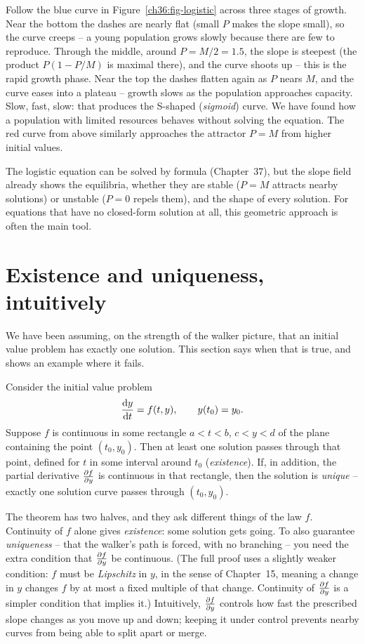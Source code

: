 \begin{walkbox}
Follow the blue curve in Figure~\ref{ch36:fig-logistic} across three stages of growth. Near the bottom the dashes are nearly flat (small $P$ makes the slope small), so the curve creeps -- a young population grows slowly because there are few to reproduce. Through the middle, around $P=M/2 = 1.5$, the slope is steepest (the product $P(1-P/M)$ is maximal there), and the curve shoots up -- this is the rapid growth phase. Near the top the dashes flatten again as $P$ nears $M$, and the curve eases into a plateau -- growth slows as the population approaches capacity. Slow, fast, slow: that produces the S-shaped (\emph{sigmoid}) curve. We have found how a population with limited resources behaves without solving the equation. The red curve from above similarly approaches the attractor $P=M$ from higher initial values.
\end{walkbox}

The logistic equation can be solved by formula (Chapter~37), but the slope field already shows the equilibria, whether they are stable ($P=M$ attracts nearby solutions) or unstable ($P=0$ repels them), and the shape of every solution. For equations that have no closed-form solution at all, this geometric approach is often the main tool.

\section{Existence and uniqueness, intuitively}
\label{ch36:sec-exist}

We have been assuming, on the strength of the walker picture, that an initial value problem has exactly one solution. This section says when that is true, and shows an example where it fails.

\begin{theorem}
\label{ch36:thm-exist}
Consider the initial value problem
\[
  \frac{\mathrm{d} y}{\mathrm{d} t} = f(t,y), \qquad y(t_0) = y_0.
\]
Suppose $f$ is continuous in some rectangle $a<t<b$, $c<y<d$ of the plane containing the point $(t_0, y_0)$. Then at least one solution passes through that point, defined for $t$ in some interval around $t_0$ (\emph{existence}). If, in addition, the partial derivative $\frac{\partial f}{\partial y}$ is continuous in that rectangle, then the solution is \emph{unique} -- exactly one solution curve passes through $(t_0,y_0)$.
\end{theorem}

The theorem has two halves, and they ask different things of the law $f$. Continuity of $f$ alone gives \emph{existence}: some solution gets going. To also guarantee \emph{uniqueness} -- that the walker's path is forced, with no branching -- you need the extra condition that $\frac{\partial f}{\partial y}$ be continuous. (The full proof uses a slightly weaker condition: $f$ must be \emph{Lipschitz} in $y$, in the sense of Chapter~15, meaning a change in $y$ changes $f$ by at most a fixed multiple of that change. Continuity of $\frac{\partial f}{\partial y}$ is a simpler condition that implies it.) Intuitively, $\frac{\partial f}{\partial y}$ controls how fast the prescribed slope changes as you move up and down; keeping it under control prevents nearby curves from being able to split apart or merge.

